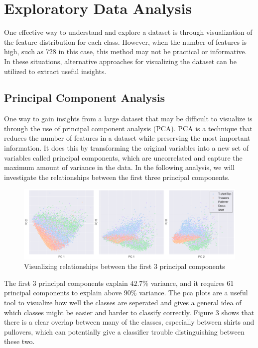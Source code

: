 \section{Exploratory Data Analysis}

One effective way to understand and explore a dataset is through visualization of the feature distribution for each class.
However, when the number of features is high, such as 728 in this case, this method may not be practical or informative.
In these situations, alternative approaches for visualizing the dataset can be utilized to extract useful insights.

\subsection{Principal Component Analysis}
One way to gain insights from a large dataset that may be difficult to visualize is through the use of principal component analysis (PCA).
PCA is a technique that reduces the number of features in a dataset while preserving the most important information.
It does this by transforming the original variables into a new set of variables called principal components, which are uncorrelated and capture the maximum amount of variance in the data.
In the following analysis, we will investigate the relationships between the first three principal components.

\begin{figure}[H]
    \includegraphics[scale=0.30]{figures_for_report/PCA}
    \captionsetup{justification=centering,margin=2cm}
    \caption{Visualizing relationships between the first 3 principal components}
\end{figure}

The first 3 principal components explain $42.7\%$ variance, and it requires 61 principal components to explain above $90\%$ variance.
The pca plots are a useful tool to visualize how well the classes are seperated and gives a general idea of which classes might be easier and harder to classify correctly.
Figure 3 shows that there is a clear overlap between many of the classes, especially between shirts and pullovers, which can potentially give a classifier trouble distinguishing between these two.

